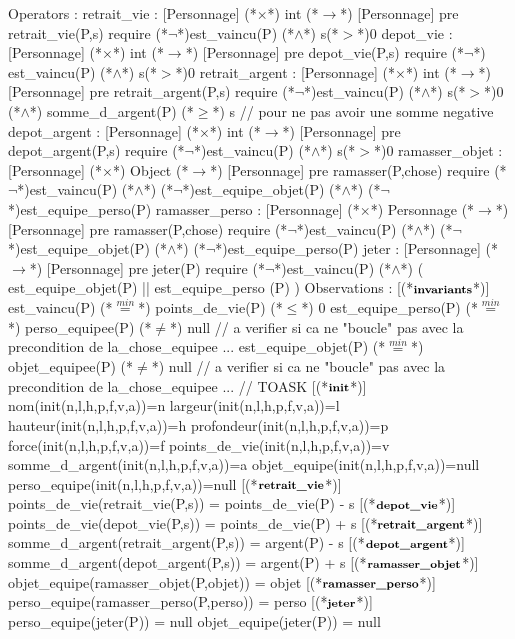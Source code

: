 \documentclass[a4paper, 11pt]{report}
\newcommand{\specB}[1]{\footnotesize\textbf{#1}}
\begin{document}
\begin{Spe}
Operators :
	retrait_vie :  [Personnage] (*$\times$*) int (*$\rightarrow$*) [Personnage]
		pre retrait_vie(P,s) require (*$\lnot$*)est_vaincu(P) (*$\land$*) s(*$>$*)0
	depot_vie : [Personnage] (*$\times$*) int (*$\rightarrow$*) [Personnage]
		pre depot_vie(P,s) require (*$\lnot$*) est_vaincu(P) (*$\land$*) s(*$>$*)0
	retrait_argent :  [Personnage] (*$\times$*) int (*$\rightarrow$*) [Personnage]
		pre retrait_argent(P,s) require (*$\lnot$*)est_vaincu(P) (*$\land$*) s(*$>$*)0 (*$\land$*) somme_d_argent(P) (*$\ge$*) s // pour ne pas avoir une somme negative
	depot_argent : [Personnage] (*$\times$*) int (*$\rightarrow$*) [Personnage]
		pre depot_argent(P,s) require (*$\lnot$*)est_vaincu(P) (*$\land$*) s(*$>$*)0
	ramasser_objet : [Personnage] (*$\times$*) Object (*$\rightarrow$*) [Personnage]
		pre ramasser(P,chose) require (*$\lnot$*)est_vaincu(P) (*$\land$*) (*$\lnot$*)est_equipe_objet(P) (*$\land$*)  (*$\lnot$*)est_equipe_perso(P)
        ramasser_perso : [Personnage] (*$\times$*) Personnage (*$\rightarrow$*) [Personnage]
		pre ramasser(P,chose) require (*$\lnot$*)est_vaincu(P) (*$\land$*) (*$\lnot$*)est_equipe_objet(P) (*$\land$*) (*$\lnot$*)est_equipe_perso(P)
	jeter : [Personnage] (*$\rightarrow$*) [Personnage]
		pre jeter(P) require (*$\lnot$*)est_vaincu(P) (*$\land$*) ( est_equipe_objet(P) || est_equipe_perso (P) )
Observations : 
	[(*$\specB{invariants}$*)]
		est_vaincu(P) (*$\stackrel{min}{=}$*) points_de_vie(P) (*$\le$*) 0
                est_equipe_perso(P) (*$\stackrel{min}{=}$*) perso_equipee(P) (*$\ne$*) null // a verifier si ca ne "boucle" pas avec la precondition de la_chose_equipee ...
		est_equipe_objet(P) (*$\stackrel{min}{=}$*) objet_equipee(P) (*$\ne$*) null // a verifier si ca ne "boucle" pas avec la precondition de la_chose_equipee ... // TOASK
	[(*$\specB{init}$*)]
		nom(init(n,l,h,p,f,v,a))=n
		largeur(init(n,l,h,p,f,v,a))=l
		hauteur(init(n,l,h,p,f,v,a))=h
		profondeur(init(n,l,h,p,f,v,a))=p
		force(init(n,l,h,p,f,v,a))=f
		points_de_vie(init(n,l,h,p,f,v,a))=v
		somme_d_argent(init(n,l,h,p,f,v,a))=a
                objet_equipe(init(n,l,h,p,f,v,a))=null
                perso_equipe(init(n,l,h,p,f,v,a))=null
	[(*$\specB{retrait\_vie}$*)]
		points_de_vie(retrait_vie(P,s)) = points_de_vie(P) - s
	[(*$\specB{depot\_vie}$*)]
		points_de_vie(depot_vie(P,s)) = points_de_vie(P) + s 
	[(*$\specB{retrait\_argent}$*)]
		somme_d_argent(retrait_argent(P,s)) = argent(P) - s 
	[(*$\specB{depot\_argent}$*)]
		somme_d_argent(depot_argent(P,s)) = argent(P) + s 
	[(*$\specB{ramasser\_objet}$*)]
		objet_equipe(ramasser_objet(P,objet)) = objet 
	[(*$\specB{ramasser\_perso}$*)]
		perso_equipe(ramasser_perso(P,perso)) = perso 
	[(*$\specB{jeter}$*)]
                perso_equipe(jeter(P)) = null
                objet_equipe(jeter(P)) = null
\end{Spe}
\end{document}
